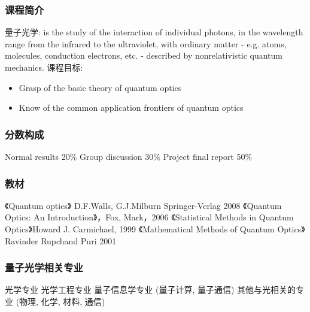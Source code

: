 

\begin{frame}
    \frametitle{课程简介}
    \begin{enumerate}
        \Item 量子光学: is the study of the interaction of individual photons, in the wavelength range from the infrared to the ultraviolet, with ordinary matter - e.g. atoms, molecules, conduction electrons, etc. - described by nonrelativistic quantum mechanics. 
        \Item 课程目标:       
        \begin{itemize}
          \item Grasp of the basic theory of quantum optics
          \item Know of the common application frontiers of quantum optics
      \end{itemize}
    \end{enumerate}
\end{frame}

\begin{frame} 
  \frametitle{分数构成}
      \begin{enumerate}
          \Item Normal results 20\%
          \Item Group discussion 30\%
          \Item Project final report 50\%
      \end{enumerate}
\end{frame}

\begin{frame}
    \frametitle{教材}
      \begin{itemize}
          \Item 《Quantum optics》  D.F.Walls, G.J.Milburn  Springer-Verlag   2008         
          \Item 《Quantum Optics: An Introduction》，Fox, Mark，2006
          \Item 《Statistical Methods in Quantum Optics》Howard J. Carmichael, 1999 
          \Item 《Mathematical Methods of Quantum Optics》Ravinder Rupchand Puri 2001
      \end{itemize}
\end{frame}

\begin{frame}
      \frametitle{量子光学相关专业}
      \begin{itemize}
        \Item 光学专业 
        \Item 光学工程专业  
        \Item 量子信息学专业 (量子计算, 量子通信)   
        \Item 其他与光相关的专业 (物理, 化学, 材料, 通信)   
    \end{itemize}  
\end{frame}

